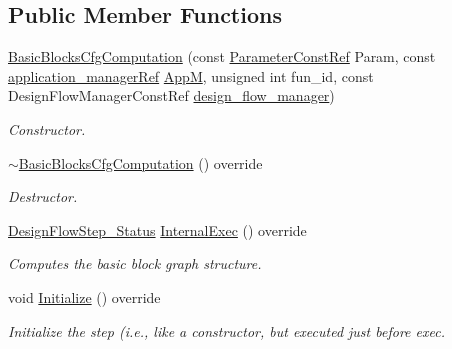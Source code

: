\subsection*{Public Member Functions}
\begin{DoxyCompactItemize}
\item 
\hyperlink{classBasicBlocksCfgComputation_abe3d2ac93963619745c87ca963de44bd}{Basic\+Blocks\+Cfg\+Computation} (const \hyperlink{Parameter_8hpp_a37841774a6fcb479b597fdf8955eb4ea}{Parameter\+Const\+Ref} Param, const \hyperlink{application__manager_8hpp_a04ccad4e5ee401e8934306672082c180}{application\+\_\+manager\+Ref} \hyperlink{classFrontendFlowStep_a0ac0d8db2a378416583f51c4faa59d15}{AppM}, unsigned int fun\+\_\+id, const Design\+Flow\+Manager\+Const\+Ref \hyperlink{classDesignFlowStep_ab770677ddf087613add30024e16a5554}{design\+\_\+flow\+\_\+manager})
\begin{DoxyCompactList}\small\item\em Constructor. \end{DoxyCompactList}\item 
\hyperlink{classBasicBlocksCfgComputation_acbd868fde81d031693af6485abc83342}{$\sim$\+Basic\+Blocks\+Cfg\+Computation} () override
\begin{DoxyCompactList}\small\item\em Destructor. \end{DoxyCompactList}\item 
\hyperlink{design__flow__step_8hpp_afb1f0d73069c26076b8d31dbc8ebecdf}{Design\+Flow\+Step\+\_\+\+Status} \hyperlink{classBasicBlocksCfgComputation_a466edbf43995a1c596d1c9f63e61e7df}{Internal\+Exec} () override
\begin{DoxyCompactList}\small\item\em Computes the basic block graph structure. \end{DoxyCompactList}\item 
void \hyperlink{classBasicBlocksCfgComputation_a210b95e3205f3d1c797be0ad2a4b6671}{Initialize} () override
\begin{DoxyCompactList}\small\item\em Initialize the step (i.\+e., like a constructor, but executed just before exec. \end{DoxyCompactList}\end{DoxyCompactItemize}
